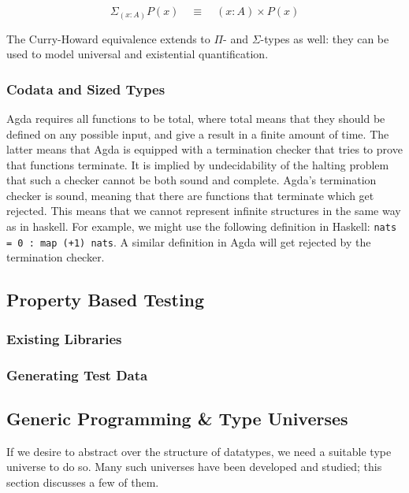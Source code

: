\documentclass[11pt]{article}
\begin{document}
\begin{equation*}
\Sigma_{(x : A)} P(x) \quad \equiv \quad (x : A) \times P(x) 
\end{equation*}

The Curry-Howard equivalence extends to $\Pi$- and $\Sigma$-types as well: they can be used to model universal and existential quantification. 

\subsubsection{Codata and Sized Types}

Agda requires all functions to be total, where total means that they should be defined on any possible input, and give a result in a finite amount of time. The latter means that Agda is equipped with a termination checker that tries to prove that functions terminate. It is implied by undecidability of the halting problem that such a checker cannot be both sound and complete. Agda's termination checker is sound, meaning that there are functions that terminate which get rejected. This means that we cannot represent infinite structures in the same way as in haskell. For example, we might use the following definition in Haskell: \texttt{nats = 0 : map (+1) nats}. A similar definition in Agda will get rejected by the termination checker. 

\subsection{Property Based Testing}

\subsubsection{Existing Libraries}

\subsubsection{Generating Test Data}

\subsection{Generic Programming \& Type Universes}

If we desire to abstract over the structure of datatypes, we need a suitable type universe to do so. Many such universes have been developed and studied; this section discusses a few of them. 
\end{document}
